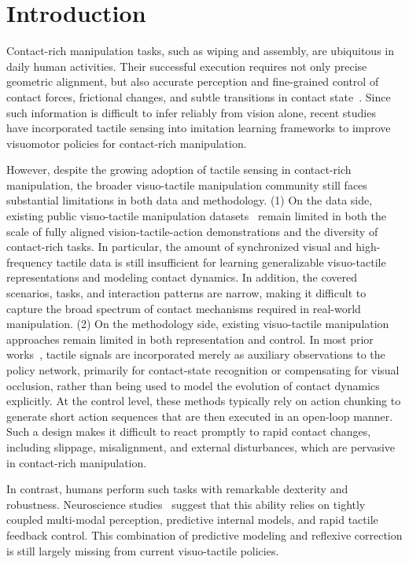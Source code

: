 \section{Introduction}
Contact-rich manipulation tasks, such as wiping and assembly, are ubiquitous in daily human activities. Their successful execution requires not only precise geometric alignment, but also accurate perception and fine-grained control of contact forces, frictional changes, and subtle transitions in contact state~\cite{zhao2024tac, cui2025vi, zhao2025tacman}. Since such information is difficult to infer reliably from vision alone, recent studies~\cite{bi2025vla, xue2025reactive, chen2025multi} have incorporated tactile sensing into imitation learning frameworks to improve visuomotor policies for contact-rich manipulation.

However, despite the growing adoption of tactile sensing in contact-rich manipulation, the broader visuo-tactile manipulation community still faces substantial limitations in both data and methodology. 
(1) On the data side, existing public visuo-tactile manipulation datasets~\cite{bi2025vla, yu2025demonstrating, bu2025agibot} remain limited in both the scale of fully aligned vision-tactile-action demonstrations and the diversity of contact-rich tasks. In particular, the amount of synchronized visual and high-frequency tactile data is still insufficient for learning generalizable visuo-tactile representations and modeling contact dynamics. In addition, the covered scenarios, tasks, and interaction patterns are narrow, making it difficult to capture the broad spectrum of contact mechanisms required in real-world manipulation.
(2) On the methodology side, existing visuo-tactile manipulation approaches remain limited in both representation and control. In most prior works~\cite{huang20243d, wu2025canonical}, tactile signals are incorporated merely as auxiliary observations to the policy network, primarily for contact-state recognition or compensating for visual occlusion, rather than being used to model the evolution of contact dynamics explicitly. At the control level, these methods typically rely on action chunking to generate short action sequences that are then executed in an open-loop manner. Such a design makes it difficult to react promptly to rapid contact changes, including slippage, misalignment, and external disturbances, which are pervasive in contact-rich manipulation. 

In contrast, humans perform such tasks with remarkable dexterity and robustness. Neuroscience studies~\cite{monzee2003effects, wolpert2001motor, kilteni2017sensorimotor, augurelle2003importance} suggest that this ability relies on tightly coupled multi-modal perception, predictive internal models, and rapid tactile feedback control. This combination of predictive modeling and reflexive correction is still largely missing from current visuo-tactile policies.
 

